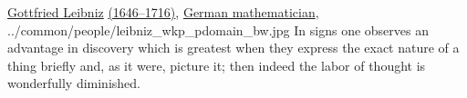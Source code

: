 \qboxnps
  {\href{http://en.wikipedia.org/wiki/Gottfried_Leibniz}{Gottfried Leibniz}
   \href{http://www-history.mcs.st-andrews.ac.uk/Timelines/TimelineC.html}{(1646--1716)},
   \href{http://www-history.mcs.st-andrews.ac.uk/BirthplaceMaps/Places/Germany.html}{German mathematician},
   \footnotemark
  }
  {../common/people/leibniz_wkp_pdomain_bw.jpg}
  {In signs one observes an advantage in discovery which is greatest when they express
   the exact nature of a thing briefly and, as it were, picture it;
   then indeed the labor of thought is wonderfully diminished.}


